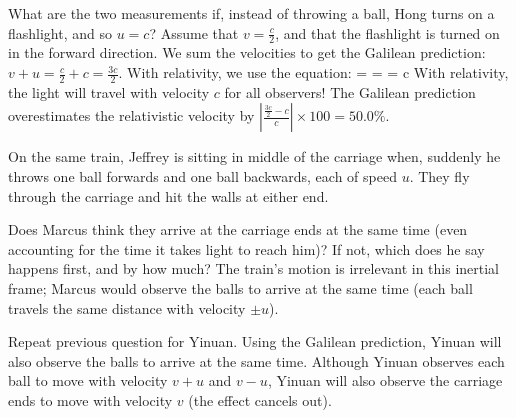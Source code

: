 \item What are the two measurements if, instead of throwing a ball, Hong turns on a flashlight, and so $u=c$?
\newline Assume that $v = \frac{c}{2}$, and that the flashlight is turned on in the forward direction. We sum the velocities to get the Galilean prediction: $v + u = \frac{c}{2} + c = \frac{3c}{2}$.
\newline With relativity, we use the equation:
\be
{} =  =  = c
\ee
With relativity, the light will travel with velocity $c$ for all observers! The Galilean prediction overestimates the relativistic velocity by $\left| \frac{\frac{3c}{2} - c}{c} \right| \times 100 = 50.0\%$.

\enu
\newpage
{}

On the same train, Jeffrey is sitting in middle of the carriage when, suddenly he throws one
ball forwards and one ball backwards, each of speed $u$.  They fly through the carriage and
hit the walls at either end.

\benu

\item Does Marcus think they arrive at the carriage ends at the same time (even accounting for the time it takes
light to reach him)? If not, which does he say happens first, and by how much?
\newline The train's motion is irrelevant in this inertial frame; Marcus would observe the balls to arrive at the same time (each ball travels the same distance with velocity $\pm u$).

\item Repeat previous question for Yinuan.
\newline Using the Galilean prediction, Yinuan will also observe the balls to arrive at the same time. Although Yinuan observes each ball to move with velocity $v+u$ and $v-u$, Yinuan will also observe the carriage ends to move with velocity $v$ (the effect cancels out).

